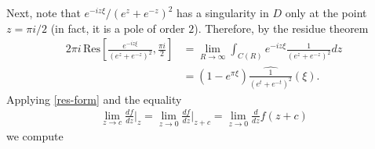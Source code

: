 \documentclass[12pt,reqno]{amsart}
\numberwithin{equation}{section}  %
\newcommand{\wh}{\widehat}
\begin{document}
        Next, note that $e^{-i z \xi}/(e^{z} + e^{-z})^{2}$
        has a singularity in $D$ only at the
        point $z = \pi i/2$ (in fact, it is a pole of order $2$).
        Therefore, by the residue theorem
        \begin{equation*}
        \begin{split}
          2 \pi i \, \text{Res} \left[ \frac{ e^{-i z \xi}}{(e^{z} +
          e^{-z})^{2}}, \frac{\pi i}{2} \right]
          & = \lim_{R \to \infty} \int_{C(R)} e^{-i z \xi}
          \frac{1}{(e^{z} + e^{-z})^{2}} dz 
          \\
          & = (1 - e^{ \pi \xi})
          \wh{\frac{1}{(e^{t} + e^{-t})^{2}}}(\xi).
        \end{split}
        \end{equation*}
        Applying \eqref{res-form} and the equality
        \begin{equation*}
        \begin{split}
          \lim_{z \to c} \frac{df}{dz} \Big |_{z} = \lim_{z \to 0}
          \frac{df}{dz}\Big |_{z + c} = \lim_{z \to 0} \frac{d}{dz}f(z + c)
        \end{split}
        \end{equation*}
        we compute
\end{document}
